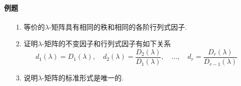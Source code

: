 \paragraph{例题}
\begin{itemize}
  \item[1.] 等价的$\lambda$-矩阵具有相同的秩和相同的各阶行列式因子.
  \vspace{2cm}
  \item[2.] 证明$\lambda$-矩阵的不变因子和行列式因子有如下关系
  $$
  d_1(\lambda) = D_1(\lambda),\quad
  d_2(\lambda) = \frac{D_2(\lambda)}{D_1(\lambda)},\quad
  \dots, \quad d_r = \frac{D_r(\lambda)}{D_{r-1}(\lambda)}
  $$ 
  \vspace{3cm}
  \item[3.] 说明$\lambda$-矩阵的标准形式是唯一的.
  \vspace{2cm} 
\end{itemize}

